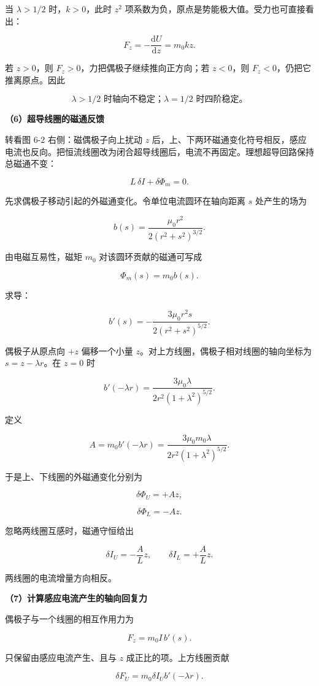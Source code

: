 \documentclass[12pt,a4paper,UTF8]{ctexart}
\begin{document}
当 \(\lambda>1/2\) 时，\(k>0\)，此时 \(z^2\)
项系数为负，原点是势能极大值。受力也可直接看出：

\[
F_z=-\frac{\mathrm{d}U}{\mathrm{d}z}=m_0kz.
\]

若 \(z>0\)，则 \(F_z>0\)，力把偶极子继续推向正方向；若 \(z<0\)，则
\(F_z<0\)，仍把它推离原点。因此

\[
\boxed{\lambda>1/2\text{ 时轴向不稳定；}\lambda=1/2\text{ 时四阶稳定。}}
\]

\textbf{（6）超导线圈的磁通反馈}

转看图 6-2 右侧：磁偶极子向上扰动 \(z\)
后，上、下两环磁通变化符号相反，感应电流也反向。把恒流线圈改为闭合超导线圈后，电流不再固定。理想超导回路保持总磁通不变：

\[L\,\delta I+\delta\Phi_m=0.\]

先求偶极子移动引起的外磁通变化。令单位电流圆环在轴向距离 \(s\)
处产生的场为

\[
b(s)=\frac{\mu_0r^2}{2(r^2+s^2)^{3/2}}.
\]

由电磁互易性，磁矩 \(m_0\) 对该圆环贡献的磁通可写成

\[\Phi_m(s)=m_0b(s).\]

求导：

\[
b'(s)=-\frac{3\mu_0r^2s}
{2(r^2+s^2)^{5/2}}.
\]

偶极子从原点向 \(+z\) 偏移一个小量
\(z\)。对上方线圈，偶极子相对线圈的轴向坐标为 \(s=z-\lambda r\)。在
\(z=0\) 时

\[
b'(-\lambda r)
=\frac{3\mu_0\lambda}
{2r^2(1+\lambda^2)^{5/2}}.
\]

定义

\[
A=m_0b'(-\lambda r)
=\frac{3\mu_0m_0\lambda}
{2r^2(1+\lambda^2)^{5/2}}.
\]

于是上、下线圈的外磁通变化分别为

\[\delta\Phi_U=+Az,\]

\[\delta\Phi_L=-Az.\]

忽略两线圈互感时，磁通守恒给出

\[
\delta I_U=-\frac{A}{L}z,
\qquad
\delta I_L=+\frac{A}{L}z.
\]

两线圈的电流增量方向相反。

\textbf{（7）计算感应电流产生的轴向回复力}

偶极子与一个线圈的相互作用力为

\[F_z=m_0I\,b'(s).\]

只保留由感应电流产生、且与 \(z\) 成正比的项。上方线圈贡献

\[
\delta F_U
=m_0\delta I_U b'(-\lambda r).
\]
\end{document}
